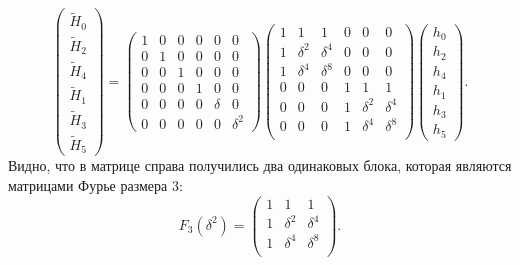 \[
    \begin{pmatrix}
        \widetilde{H}_0 \\
        \widetilde{H}_2 \\
        \widetilde{H}_4 \\
        \widetilde{H}_1 \\
        \widetilde{H}_3 \\
        \widetilde{H}_5
    \end{pmatrix}
    =
    \begin{pmatrix}
        1 & 0 & 0 & 0 & 0      & 0        \\
        0 & 1 & 0 & 0 & 0      & 0        \\
        0 & 0 & 1 & 0 & 0      & 0        \\
        0 & 0 & 0 & 1 & 0      & 0        \\
        0 & 0 & 0 & 0 & \delta & 0        \\
        0 & 0 & 0 & 0 & 0      & \delta^2
    \end{pmatrix}
    \begin{pmatrix}
        1 & 1        & 1        & 0 & 0        & 0        \\
        1 & \delta^2 & \delta^4 & 0 & 0        & 0        \\
        1 & \delta^4 & \delta^8 & 0 & 0        & 0        \\
        0 & 0        & 0        & 1 & 1        & 1        \\
        0 & 0        & 0        & 1 & \delta^2 & \delta^4 \\
        0 & 0        & 0        & 1 & \delta^4 & \delta^8 \\
    \end{pmatrix}
    \begin{pmatrix}
        h_0 \\
        h_2 \\
        h_4 \\
        h_1 \\
        h_3 \\
        h_5
    \end{pmatrix} .
\]
Видно, что в матрице справа получились два одинаковых блока, которая являются матрицами Фурье размера 3:
\[
    F_3(\delta^2)
    = \begin{pmatrix}
        1 & 1        & 1        \\
        1 & \delta^2 & \delta^4 \\
        1 & \delta^4 & \delta^8 \\
    \end{pmatrix} .
\]

